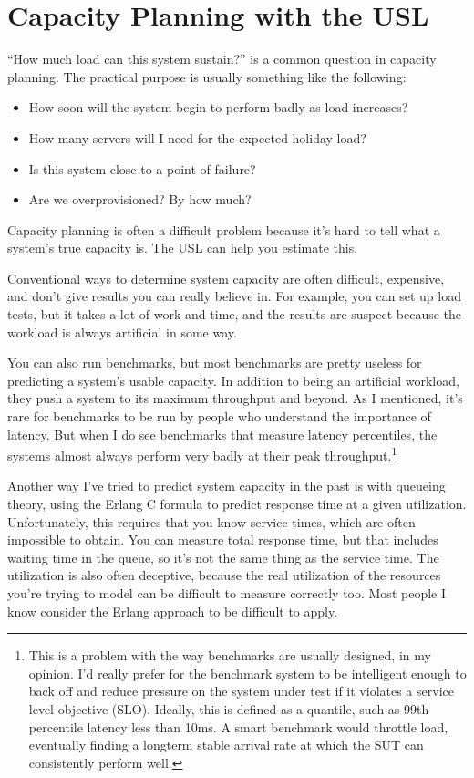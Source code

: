 \documentclass{vivid_layout}
\begin{document}
\section{Capacity Planning with the USL}

``How much load can this system sustain?'' is a common question in capacity
planning. The practical purpose is usually something like the following:

\begin{itemize}
\item How soon will the system begin to perform badly as load increases?
\item How many servers will I need for the expected holiday load?
\item Is this system close to a point of failure?
\item Are we overprovisioned? By how much?
\end{itemize}

Capacity planning is often a difficult problem because it's hard to tell what a
system's true capacity is. The USL can help you estimate this.

Conventional ways to determine system capacity are often difficult, expensive,
and don't give results you can really believe in. For example, you can set up
load tests, but it takes a lot of work and time, and the results are suspect
because the workload is always artificial in some way.

You can also run benchmarks, but most benchmarks are pretty useless for
predicting a system's usable capacity. In addition to being an artificial
workload, they push a system to its maximum throughput and beyond. As I
mentioned, it's rare for benchmarks to be run by people who understand the
importance of latency. But when I do see benchmarks that measure latency
percentiles, the systems almost always perform very badly at their peak
throughput.\footnote{This is a problem with the way benchmarks are usually
designed, in my opinion. I'd really prefer for the benchmark system to be
intelligent enough to back off and reduce pressure on the system under test if
it violates a service level objective (SLO).  Ideally, this is defined as a
quantile, such as 99th percentile latency less than 10ms.  A smart benchmark
would throttle load, eventually finding a longterm stable arrival rate at which
the SUT can consistently perform well.}

Another way I've tried to predict system capacity in the past is with queueing
theory, using the Erlang C formula to predict response time at a given
utilization.  Unfortunately, this requires that you know service times,
which are often impossible to obtain. You can measure total response time, but
that includes waiting time in the queue, so it's not the same thing as the
service time. The utilization is also often deceptive, because the real
utilization of the resources you're trying to model can be difficult to
measure correctly too. Most people I know consider the Erlang approach to be
difficult to apply.
\end{document}
